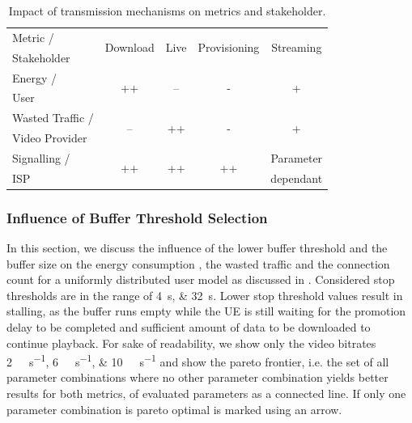 \begin{table}
  \centering
  \begin{tabular}{lcccc}
    \toprule
    Metric /& \multirow{2}{*}{Download} & \multirow{2}{*}{Live} & \multirow{2}{*}{Provisioning} & \multirow{2}{*}{Streaming}\\
    Stakeholder & & & &\\
    \midrule
    Energy /       & \multirow{2}{*}{++}       & \multirow{2}{*}{--}   & \multirow{2}{*}{-} & \multirow{2}{*}{+}\\
    User & & & &\\
    Wasted Traffic / & \multirow{2}{*}{--} & \multirow{2}{*}{++} & \multirow{2}{*}{-} & \multirow{2}{*}{+} \\
    Video Provider & & & &\\
    Signalling /& \multirow{2}{*}{++} & \multirow{2}{*}{++} & \multirow{2}{*}{++} & Parameter\\
    \gls{ISP} & & & &dependant\\
    \bottomrule
  \end{tabular}
  \caption{Impact of transmission mechanisms on metrics and stakeholder.}
  \label{tab:application:lte_video:trade_offs:mechanism_selection:lessons_learned}
\end{table}

\subsubsection*{Influence of Buffer Threshold Selection}\label{sec:application:lte_video:trade_offs:buffer_threshold_influence}

In this section, we discuss the influence of the lower buffer threshold \bufferlower and the buffer size \buffersize on the energy consumption \power, the wasted traffic \meanwastedtraffic and the connection count \connectioncount for a uniformly distributed user model as discussed in .
Considered stop thresholds are in the range of \SIlist{4;32}{\second}.
Lower stop threshold values result in stalling, as the buffer runs empty while the \gls{UE} is still waiting for the promotion delay to be completed and sufficient amount of data to be downloaded to continue playback.
For sake of readability, we show only the video bitrates \SIlist{2;6;10}{\mega\bit\per\second} and show the pareto frontier, i.e. the set of all parameter combinations where no other parameter combination yields better results for both metrics, of evaluated parameters as a connected line.
If only one parameter combination is pareto optimal is marked using an arrow.

